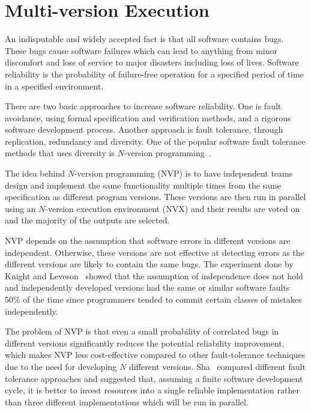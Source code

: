 \chapter{Multi-version Execution}
\label{chap:multi-version}

An indisputable and widely accepted fact is that all software contains bugs.
These bugs cause software failures which can lead to anything from minor
discomfort and loss of service to major disasters including loss of lives.
Software reliability is the probability of failure-free operation for a
specified period of time in a specified environment.

There are two basic approaches to increase software reliability. One is fault
avoidance, using formal specification and verification methods, and a rigorous
software development process. Another approach is fault tolerance, through
replication, redundancy and diversity. One of the popular software fault
tolerance methods that uses diversity is $N$-version
programming~\cite{avizienis:nvp}.


The idea behind $N$-version programming (NVP) is to have independent teams
design and implement the same functionality multiple times from the same
specification as different program versions. These versions are then run in
parallel using an $N$-version execution environment (NVX) and their results are
voted on and the majority of the outputs are selected.

NVP depends on the assumption that software errors in different versions are
independent. Otherwise, these versions are not effective at detecting errors as
the different versions are likely to contain the same bugs. The experiment done
by Knight and Leveson~\cite{knight86,knight90} showed that the assumption of
independence does not hold and independently developed versions had the same or
similar software faults 50\% of the time since programmers tended to commit
certain classes of mistakes independently.

The problem of NVP is that even a small probability of correlated bugs in
different versions significantly reduces the potential reliability improvement,
which makes NVP less cost-effective compared to other fault-tolerance
techniques due to the need for developing $N$ different versions.
Sha~\cite{lui01} compared different fault tolerance approaches and suggested
that, assuming a finite software development cycle, it is better to invest
resources into a single reliable implementation rather than three different
implementations which will be run in parallel.

